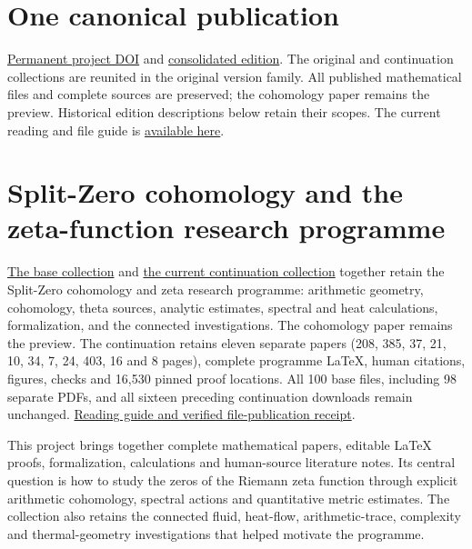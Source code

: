 \documentclass[
]{article}
\author{}
\date{}
\begin{document}
\section*{One canonical publication}
\href{https://doi.org/10.5281/zenodo.22678085}{Permanent project DOI} and \href{https://zenodo.org/records/22950644}{consolidated edition}. The original and continuation collections are reunited in the original version family. All published mathematical files and complete sources are preserved; the cohomology paper remains the preview. Historical edition descriptions below retain their scopes. The current reading and file guide is \href{https://github.com/KokunoYumeto/zeta-function-research-reader/blob/main/workbenches/splitzero-tandem/publication-consolidation/README.md}{available here}.


\section{Split-Zero cohomology and the zeta-function research
programme}\label{split-zero-cohomology-and-the-zeta-function-research-programme}

\href{https://zenodo.org/records/22911829}{The base collection} and
\href{https://zenodo.org/records/22950644}{the current continuation
collection} together retain the Split-Zero cohomology and zeta research
programme: arithmetic geometry, cohomology, theta sources, analytic
estimates, spectral and heat calculations, formalization, and the
connected investigations. The cohomology paper remains the preview. The
continuation retains eleven separate papers (208, 385, 37, 21, 10, 34,
7, 24, 403, 16 and 8 pages), complete programme LaTeX, human citations,
figures, checks and 16,530 pinned proof locations. All 100 base files,
including 98 separate PDFs, and all sixteen preceding continuation
downloads remain unchanged.
\href{https://github.com/KokunoYumeto/zeta-function-research-reader/blob/main/workbenches/splitzero-tandem/continuations/20260923-retained-source-publication/README.md}{Reading
guide and verified file-publication receipt}.

This project brings together complete mathematical papers, editable
LaTeX proofs, formalization, calculations and human-source literature
notes. Its central question is how to study the zeros of the Riemann
zeta function through explicit arithmetic cohomology, spectral actions
and quantitative metric estimates. The collection also retains the
connected fluid, heat-flow, arithmetic-trace, complexity and
thermal-geometry investigations that helped motivate the programme.
\end{document}
